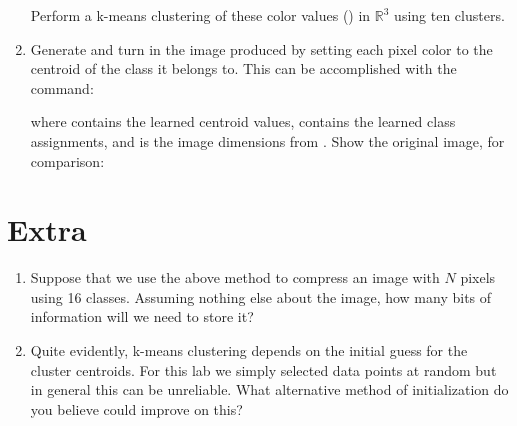 \documentclass[11pt,noanswers,addpoints]{exam}
\begin{document}
\begin{enumerate}
Perform
a k-means clustering of these color values () in $\mathbb{R}^3$ using ten clusters.
\item  Generate and turn in the image produced by setting each pixel color to the centroid of
the class it belongs to. This can be accomplished with the command:

 
where  contains the learned centroid values,  contains the learned 
class assignments, and  is the image dimensions from . Show the original image, for comparison:


\end{enumerate}

\section{Extra}

\begin{enumerate}
\item Suppose that we use the above method to compress an image with $N$ pixels using 16 classes. Assuming
nothing else about the image, how many bits of information will we need to store it?
\item Quite evidently, k-means clustering depends on the initial guess for the cluster centroids. For this
lab we simply selected data points at random but in general this can be unreliable. What alternative method
of initialization do you believe could improve on this?
\end{enumerate}
\end{document}
